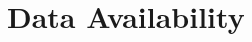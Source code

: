 \documentclass[fleqn,usenatbib]{rasti}
\begin{document}
\section*{Data Availability}












\bsp	%
\label{lastpage}
\end{document}
